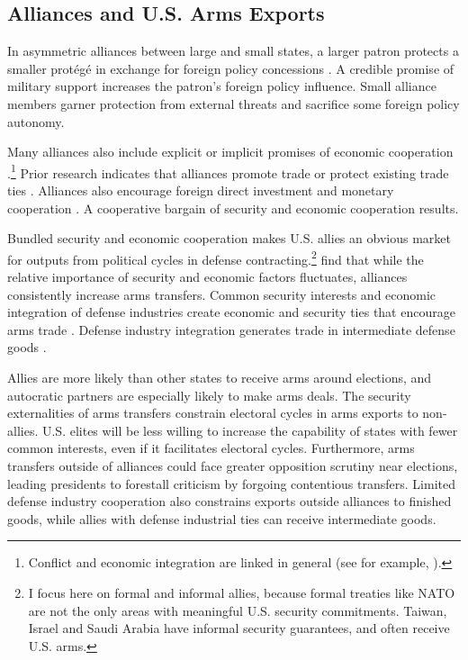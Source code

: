 \documentclass[12pt]{article}
\begin{document}
\subsection{Alliances and U.S. Arms Exports}


In asymmetric alliances between large and small states, a larger patron protects a smaller prot{\'e}g{\'e}  in exchange for foreign policy concessions \citep{Morrow1991}.
A credible promise of military support increases the patron's foreign policy influence. 
Small alliance members garner protection from external threats and sacrifice some foreign policy autonomy. 


Many alliances also include explicit or implicit promises of economic cooperation \citep{GowaMansfield2004, LongLeeds2006, Davis2008, Poast2012}.\footnote{Conflict and economic integration are linked in general (see for example, \citep{GartzkeLi2003, Chen2021}).}
Prior research indicates that alliances promote trade \citep{Gowa1995, GowaMansfield2004, Haim2016} or protect existing trade ties \citep{Fordham2010}.
Alliances also encourage foreign direct investment \citep{LiVashchilko2010} and monetary cooperation \citep{Li2003}.
A cooperative bargain of security and economic cooperation results. 


Bundled security and economic cooperation makes U.S. allies an obvious market for outputs from political cycles in defense contracting.\footnote{I focus here on formal and informal allies, because formal treaties like NATO are not the only areas with meaningful U.S. security commitments. Taiwan, Israel and Saudi Arabia have informal security guarantees, and often receive U.S. arms.}
\citet{Thurneretal2019} find that while the relative importance of security and economic factors fluctuates, alliances consistently increase arms transfers.
Common security interests and economic integration of defense industries create economic and security ties that encourage arms trade \citep{Bitzinger1994}. 
Defense industry integration generates trade in intermediate defense goods \citep{Brooks2005}. 


Allies are more likely than other states to receive arms around elections, and autocratic partners are especially likely to make arms deals. 
The security externalities of arms transfers constrain electoral cycles in arms exports to non-allies. 
U.S. elites will be less willing to increase the capability of states with fewer common interests, even if it facilitates electoral cycles.
Furthermore, arms transfers outside of alliances could face greater opposition scrutiny near elections, leading presidents to forestall criticism by forgoing contentious transfers.
Limited defense industry cooperation also constrains exports outside alliances to finished goods, while allies with defense industrial ties can receive intermediate goods.
\end{document}
